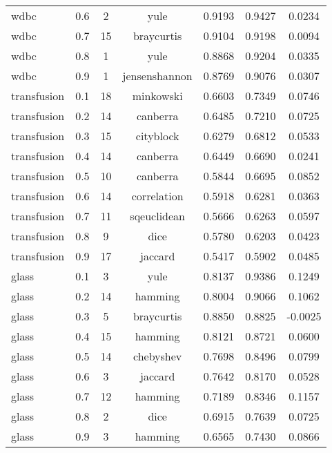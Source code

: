 \begin{table}[ht]
\begin{tabular}{lcccccc}
wdbc & 0.6 & 2 & yule & 0.9193 & 0.9427 & 0.0234 \\
wdbc & 0.7 & 15 & braycurtis & 0.9104 & 0.9198 & 0.0094 \\
wdbc & 0.8 & 1 & yule & 0.8868 & 0.9204 & 0.0335 \\
wdbc & 0.9 & 1 & jensenshannon & 0.8769 & 0.9076 & 0.0307 \\
transfusion & 0.1 & 18 & minkowski & 0.6603 & 0.7349 & 0.0746 \\
transfusion & 0.2 & 14 & canberra & 0.6485 & 0.7210 & 0.0725 \\
transfusion & 0.3 & 15 & cityblock & 0.6279 & 0.6812 & 0.0533 \\
transfusion & 0.4 & 14 & canberra & 0.6449 & 0.6690 & 0.0241 \\
transfusion & 0.5 & 10 & canberra & 0.5844 & 0.6695 & 0.0852 \\
transfusion & 0.6 & 14 & correlation & 0.5918 & 0.6281 & 0.0363 \\
transfusion & 0.7 & 11 & sqeuclidean & 0.5666 & 0.6263 & 0.0597 \\
transfusion & 0.8 & 9 & dice & 0.5780 & 0.6203 & 0.0423 \\
transfusion & 0.9 & 17 & jaccard & 0.5417 & 0.5902 & 0.0485 \\
glass & 0.1 & 3 & yule & 0.8137 & 0.9386 & 0.1249 \\
glass & 0.2 & 14 & hamming & 0.8004 & 0.9066 & 0.1062 \\
glass & 0.3 & 5 & braycurtis & 0.8850 & 0.8825 & -0.0025 \\
glass & 0.4 & 15 & hamming & 0.8121 & 0.8721 & 0.0600 \\
glass & 0.5 & 14 & chebyshev & 0.7698 & 0.8496 & 0.0799 \\
glass & 0.6 & 3 & jaccard & 0.7642 & 0.8170 & 0.0528 \\
glass & 0.7 & 12 & hamming & 0.7189 & 0.8346 & 0.1157 \\
glass & 0.8 & 2 & dice & 0.6915 & 0.7639 & 0.0725 \\
glass & 0.9 & 3 & hamming & 0.6565 & 0.7430 & 0.0866 \\
\hline
\end{tabular}
\end{table}